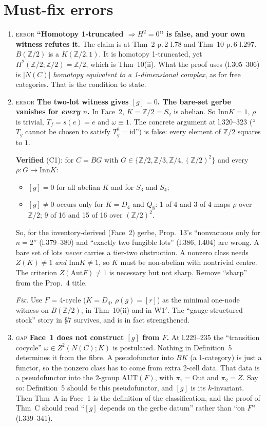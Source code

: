 \documentclass[11pt]{article}
\newcommand{\Z}{\mathbb{Z}}
\newcommand{\iss}[1]{\textsc{#1}}
\begin{document}
\section{Must-fix errors}
\begin{enumerate}[label=\textbf{E\arabic*},leftmargin=*]
\item \iss{error} \textbf{``Homotopy 1-truncated $\Rightarrow H^2=0$'' is false, and your own
witness refutes it.} The claim is at Thm~2 p.\,2 l.78 and Thm~10 p.\,6 l.297. $B(\Z/2)$ is a
$K(\Z/2,1)$. It is homotopy 1-truncated, yet $H^2(\Z/2;\Z/2)=\Z/2$, which is Thm~10(ii). What
the proof uses (l.305--306) is \emph{$|N(C)|$ homotopy equivalent to a 1-dimensional complex}, as
for free categories. That is the condition to state.

\item \iss{error} \textbf{The two-lot witness gives $[g]=0$. The bare-set gerbe vanishes for
\emph{every} $n$.} In Face~2, $K=\Z/2=S_2$ is abelian. So $\mathrm{Inn}K=1$, $\rho$ is trivial,
$T_f=s(e)=e$ and $\omega\equiv1$. The concrete argument at l.320--323 (``$T_g$ cannot be chosen to
satisfy $T_g^2=\mathrm{id}$'') is false: every element of $\Z/2$ squares to $1$.

\textbf{Verified} (C1): for $C=BG$ with $G\in\{\Z/2,\Z/3,\Z/4,(\Z/2)^2\}$ and every
$\rho:G\to\mathrm{Inn}K$:
\begin{itemize}[leftmargin=1.2em]
\item $[g]=0$ for all abelian $K$ and for $S_3$ and $S_4$;
\item $[g]\neq0$ occurs only for $K=D_4$ and $Q_8$: 1 of 4 and 3 of 4 maps $\rho$ over $\Z/2$;
9 of 16 and 15 of 16 over $(\Z/2)^2$.
\end{itemize}
So, for the inventory-derived (Face~2) gerbe, Prop.~13's ``nonvacuous only for $n=2$''
(l.379--380) and ``exactly two fungible lots'' (l.386, l.404) are wrong. A bare set of lots
\emph{never} carries a tier-two obstruction. A nonzero class needs $Z(K)\neq1$ \emph{and}
$\mathrm{Inn}K\neq1$, so $K$ must be non-abelian with nontrivial centre. The criterion
$Z(\mathrm{Aut}F)\ne1$ is necessary but not sharp. Remove ``sharp'' from the Prop.~4 title.

\emph{Fix.} Use $F$ = 4-cycle ($K=D_4$, $\rho(g)=[r]$) as the minimal one-node witness on
$B(\Z/2)$, in Thm~10(ii) and in W1$'$. The ``gauge-structured stock'' story in \S7 survives, and is
in fact strengthened.

\item \iss{gap} \textbf{Face~1 does not construct $[g]$ from $F$.} At l.229--235 the ``transition
cocycle'' $\omega\in Z^2(N(C);K)$ is postulated. Nothing in Definition~5 determines it from the
fibre. A pseudofunctor into $BK$ (a 1-category) is just a functor, so the nonzero class has to
come from extra 2-cell data. That data is a pseudofunctor into the 2-group $\mathrm{AUT}(F)$,
with $\pi_1=\mathrm{Out}$ and $\pi_2=Z$. Say so: Definition~5 should \emph{be} this pseudofunctor,
and $[g]$ is its $k$-invariant. Then Thm~A in Face~1 is the definition of the classification, and
the proof of Thm~C should read ``$[g]$ depends on the gerbe datum'' rather than ``on $F$''
(l.339--341).


\end{enumerate}
\end{document}
